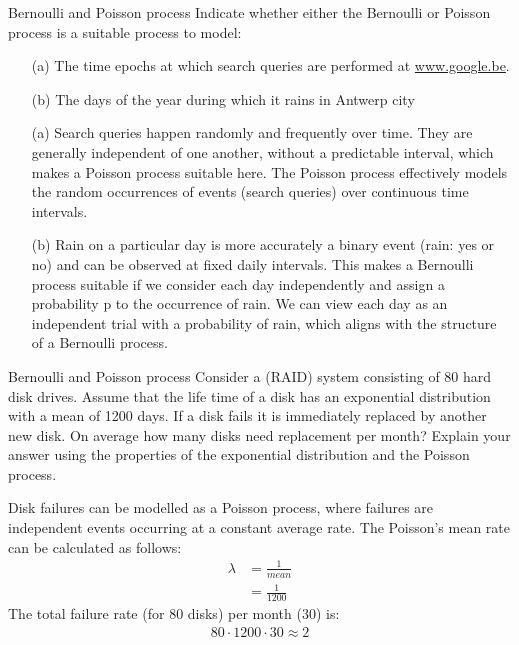 \begin{problem}{Bernoulli and Poisson process}
Indicate whether either the Bernoulli or Poisson process is a suitable process to model:
\begin{itemize}
    \item[(a)] The time epochs at which search queries are performed at \url{www.google.be}.
\item[(b)] The days of the year during which it rains in Antwerp city
\end{itemize}
\end{problem}

\begin{solution}
\begin{itemize}
\item[(a)] Search queries happen randomly and frequently over time. They are generally independent of one another, without a predictable interval, which makes a Poisson process suitable here. The Poisson process effectively models the random occurrences of events (search queries) over continuous time intervals.
\item[(b)] Rain on a particular day is more accurately a binary event (rain: yes or no) and can be observed at fixed daily intervals. This makes a Bernoulli process suitable if we consider each day independently and assign a probability p to the occurrence of rain. We can view each day as an independent trial with a probability of rain, which aligns with the structure of a Bernoulli process.
\end{itemize}
\end{solution}

\begin{problem}{Bernoulli and Poisson process}
Consider a (RAID) system consisting of 80 hard
disk drives. Assume that the life time of a disk has an exponential distribution with a
mean of 1200 days. If a disk fails it is immediately replaced by another new disk. On
average how many disks need replacement per month? Explain your answer using the
properties of the exponential distribution and the Poisson process.
\end{problem}

\begin{solution}
Disk failures can be modelled as a Poisson process, where failures are independent events occurring at a constant average rate. The Poisson's mean rate can be calculated as follows:
\begin{align*}
    \lambda &= \frac{1}{mean}\\
            &= \frac{1}{1200}
\end{align*}
The total failure rate (for 80 disks) per month (30) is:
\begin{align*}
    80 \cdot 1200 \cdot 30 \approx 2
\end{align*}
\end{solution}